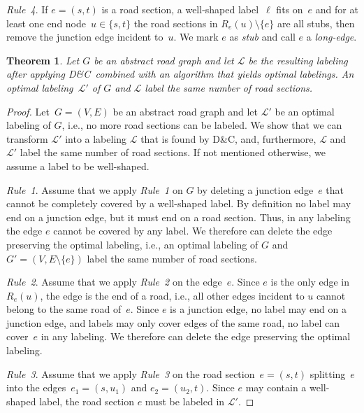\documentclass[a4paper,11pt]{article}
\newtheorem{theorem}{Theorem}
\newcommand{\RuleA}{\textit{Rule~1}\xspace}
\newcommand{\RuleB}{\textit{Rule~2}\xspace}
\newcommand{\RuleC}{\textit{Rule~3}\xspace}
\newcommand{\RuleD}{\textit{Rule~4}\xspace}
\newcommand{\Shredder}{\textsc{D\&C}}
\begin{document}
\RuleD.  If $e=(s,t)$ is a road section, a well-shaped label~$\ell$
fits on~$e$ and for at least one end node~$u\in\{s,t\}$ the road
sections in $R_e(u)\setminus\{e\}$ are all stubs, then remove the
junction edge incident to~$u$. We mark $e$ as \emph{stub} and call $e$
a \emph{long-edge}.


\newcommand{\thmRules}{Let $G$ be an
  abstract road graph and let $\mathcal L$ be the resulting labeling
  after applying \Shredder\ combined with an algorithm that yields optimal labelings. An optimal labeling~$\mathcal L'$ of $G$ and $\mathcal
  L$ label the same number of road sections.  }

\begin{theorem}\label{apx:thm:rules}
\thmRules
\end{theorem}

\begin{proof}
  Let~$G=(V,E)$ be an abstract road graph and let $\mathcal L'$ be an
  optimal labeling of $G$, i.e., no more road sections can be labeled.
  We show that we can transform $\mathcal L'$ into a labeling
  $\mathcal L$ that is found by \Shredder, and, furthermore, $\mathcal
  L$ and $\mathcal L'$ label the same number of road sections. If not
  mentioned otherwise, we assume a label to be well-shaped.
 
  \RuleA. Assume that we apply \RuleA on $G$ by deleting a junction
  edge~$e$ that cannot be completely covered by a well-shaped
  label. By definition no label may end on a junction edge, but it
  must end on a road section. Thus, in any labeling the edge $e$
  cannot be covered by any label. We therefore can delete the edge
  preserving the optimal labeling, i.e., an optimal labeling of $G$
  and $G'=(V,E\setminus\{e\})$ label the same number of road sections.

  \RuleB. Assume that we apply \RuleB on the edge~$e$. Since $e$ is
  the only edge in $R_e(u)$, the edge is the end of a road, i.e., all
  other edges incident to $u$ cannot belong to the same road of~$e$. Since $e$ is a junction edge, no label may end on a junction
  edge, and labels may only cover edges of the same road, no label can
  cover~$e$ in any labeling. We therefore can delete the edge preserving the optimal labeling.

  \RuleC. Assume that we apply \RuleC on the road section~$e=(s,t)$
  splitting~$e$ into the edges~$e_1=(s,u_1)$ and $e_2=(u_2,t)$.
  Since $e$  may
  contain a well-shaped label, the road section $e$ must be labeled in
  $\mathcal L'$.


\end{proof}
\end{document}

